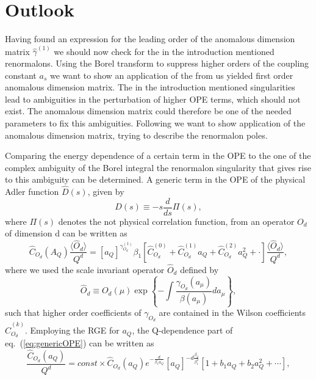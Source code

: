 \chapter{Outlook}
Having found an expression for the leading order of the anomalous dimension matrix $\hat \gamma^{(1)}$ we should now check for the in the introduction mentioned renormalons. Using the Borel transform to suppress higher orders of the coupling constant $a_s$ we want to show an application of the from us yielded first order anomalous dimension matrix. The in the introduction mentioned singularities lead to ambiguities in the perturbation of higher OPE terms, which should not exist. The anomalous dimension matrix could therefore be one of the needed parameters to fix this ambiguities. Following \cite{bj08} we want to show application of the anomalous dimension matrix, trying to describe the renormalon poles.
\par
Comparing the energy dependence of a certain term in the OPE to the one of the complex ambiguity of the Borel integral the renormalon singularity that gives rise to this ambiguity can be determined. A generic term in the OPE of the physical Adler function $\hat D(s)$, given by
\begin{equation}
	D(s) \equiv -s \frac{d}{ds} \Pi(s),
\end{equation}
where $\Pi(s)$ denotes the not physical correlation function, from an operator $O_d$ of dimension d can be written as
\begin{equation}
	\label{eq:genericOPE}
	\hat C_{O_d}(A_Q) \frac{\langle \hat O_d \rangle}{Q^d} = [a_Q]^{\gamma^{(1)}_{O_d}}{\beta_1} \left[\hat C^{(0)}_{O_d} + \hat C^{(1)}_{O_d} a_Q + \hat C^(2)_{O_d} a^2_Q + \cdot\right] \frac{\langle \hat O_d \rangle}{Q^d}, 
\end{equation}
where we used the scale invariant operator $\hat O_d$ defined by
\begin{equation}
	\hat O_d \equiv O_d(\mu) \exp \left\{- \int \frac{\gamma_{O_d}(a_\mu)}{\beta(a_\mu)}da_\mu\right\},
\end{equation}
such that higher order coefficients of $\gamma_{O_d}$ are contained in the Wilson coefficients $\hat C^{(k)}_{O_d}$. Employing the RGE for $a_Q$, the Q-dependence part of eq.~(\ref{eq:genericOPE}) can be written as 
\begin{equation}
	\label{eq:genericOPERGE}
	\frac{\hat C_{O_d}(a_Q)}{Q^d} = const \times \hat C_{O_d}(a_Q) e^{-\frac{d}{\beta_1 a_Q}}[a_Q]^{-d\frac{\beta_2}{\beta^2_1}}  \left[1 + b_1 a_Q + b_2 a^2_Q + \cdots \right],
\end{equation}

